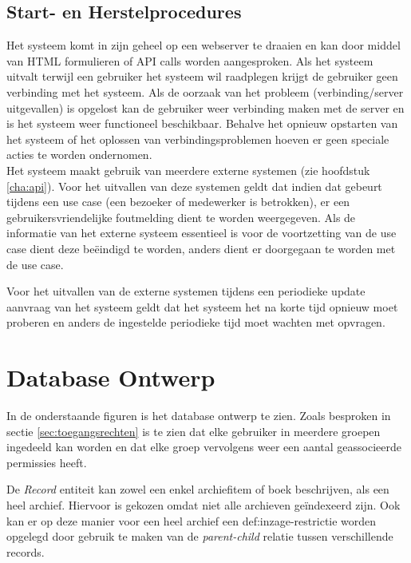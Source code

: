 \documentclass[a4paper,titlepage]{report}
\begin{document}
  
  \section{Start- en Herstelprocedures}
  \label{sec:startherstel}  
  Het systeem komt in zijn geheel op een webserver te draaien en kan door
  middel van HTML formulieren of API calls worden aangesproken. Als het
  systeem uitvalt terwijl een gebruiker het systeem wil raadplegen krijgt de
  gebruiker geen verbinding met het systeem. Als de oorzaak van het probleem
  (verbinding/server uitgevallen) is opgelost kan de gebruiker weer verbinding
  maken met de server en is het systeem weer functioneel beschikbaar. Behalve
  het opnieuw opstarten van het systeem of het oplossen van
  verbindingsproblemen hoeven er geen speciale acties te worden ondernomen.\\
  
  Het systeem maakt gebruik van meerdere externe systemen (zie
  hoofdstuk \ref{cha:api}). Voor het uitvallen van deze systemen geldt dat
  indien dat gebeurt tijdens een use case (een bezoeker of
  medewerker is betrokken), er een gebruikersvriendelijke foutmelding dient te
  worden weergegeven. Als de informatie van het externe systeem essentieel is
  voor de voortzetting van de use case dient deze be\"eindigd te worden,
  anders dient er doorgegaan te worden met de use case.
    
  Voor het uitvallen van de externe systemen tijdens een periodieke update
  aanvraag van het systeem geldt dat het systeem het  na korte tijd opnieuw
  moet proberen en anders de ingestelde periodieke tijd moet wachten met
  opvragen.
    
   
  

\chapter{Database Ontwerp}
\label{cha:db}
In de onderstaande figuren is het database ontwerp te zien. Zoals besproken in
sectie \ref{sec:toegangsrechten} is te zien dat elke gebruiker in meerdere
groepen ingedeeld kan worden en dat elke groep vervolgens weer een aantal
geassocieerde permissies heeft. 

De \emph{Record} entiteit kan zowel een enkel archiefitem of boek beschrijven,
als een heel archief. Hiervoor is gekozen omdat niet alle archieven
ge\"indexeerd zijn. Ook kan er op deze manier voor een heel archief een
\gls{def:inzage-restrictie} worden opgelegd door gebruik te maken van de
\emph{parent-child} relatie tussen verschillende records.
\end{document}
